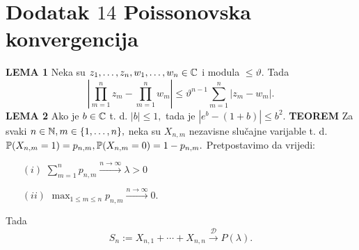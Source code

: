 \documentclass{article}
\begin{document}
\section{Dodatak \(14\) Poissonovska konvergencija}
\textbf{LEMA 1}\newline
Neka su \(z_1,\ldots,z_n,w_1,\ldots,w_n\in\Bbb C\) i modula \(\le\vartheta.\) Tada \[\left|\prod_{m=1}^nz_m-\prod_{m=1}^nw_m\right|\le\vartheta^{n-1}\sum_{m=1}^n|z_m-w_m|.\]
\textbf{LEMA 2} Ako je \(b\in\Bbb C\) t. d. \(|b|\le 1,\) tada je \(|e^b-(1+b)|\le b^2.\)\newline\newline
\textbf{TEOREM}\newline 
Za svaki \(n\in\Bbb N,m\in\{1,\ldots,n\},\) neka su \(X_{n,m}\) nezavisne slučajne varijable t. d. \(\Bbb P(X_{n,m}=1)=p_{n,m},\Bbb P(X_{n,m}=0)=1-p_{n,m}.\) Pretpostavimo da vrijedi:
\begin{enumerate}
    \item[\((i)\)] \(\displaystyle\sum_{m=1}^np_{n,m}\overset{n\to\infty}{\longrightarrow}\lambda>0\)
    \item[\((ii)\)] \(\displaystyle\max_{1\le m\le n}p_{n,m}\overset{n\to\infty}{\longrightarrow}0.\)
\end{enumerate} Tada \[S_n:=X_{n,1}+\cdots+X_{n,n}\overset{\mathcal D}{\longrightarrow}P(\lambda).\]
\end{document}
